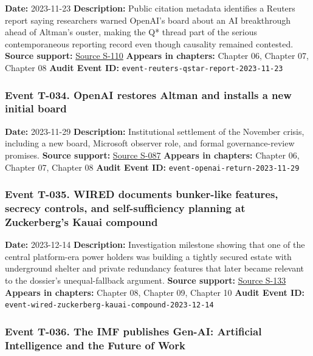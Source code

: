 \documentclass[
  american,
  11pt,
  letterpaper,
]{article}
\begin{document}
\textbf{Date:} 2023-11-23 \textbf{Description:} Public citation metadata
identifies a Reuters report saying researchers warned OpenAI's board
about an AI breakthrough ahead of Altman's ouster, making the Q* thread
part of the serious contemporaneous reporting record even though
causality remained contested. \textbf{Source support:}
\hyperref[source-s-110-openai-researchers-warned-board-of-ai-breakthrough-ahead-of-ceo-ouster-sources-say]{Source
S-110} \textbf{Appears in chapters:} Chapter 06, Chapter 07, Chapter 08
\textbf{Audit Event ID:} \texttt{event-reuters-qstar-report-2023-11-23}

\subsubsection{Event T-034. OpenAI restores Altman and installs a new
initial
board}\label{event-t-034-openai-restores-altman-and-installs-a-new-initial-board}

\textbf{Date:} 2023-11-29 \textbf{Description:} Institutional settlement
of the November crisis, including a new board, Microsoft observer role,
and formal governance-review promises. \textbf{Source support:}
\hyperref[source-s-087-sam-altman-returns-as-ceo-openai-has-a-new-initial-board]{Source
S-087} \textbf{Appears in chapters:} Chapter 06, Chapter 07, Chapter 08
\textbf{Audit Event ID:} \texttt{event-openai-return-2023-11-29}

\subsubsection{Event T-035. WIRED documents bunker-like features,
secrecy controls, and self-sufficiency planning at Zuckerberg's Kauai
compound}\label{event-t-035-wired-documents-bunker-like-features-secrecy-controls-and-self-sufficiency-planning-at-zuckerberg-s-kauai-compound}

\textbf{Date:} 2023-12-14 \textbf{Description:} Investigation milestone
showing that one of the central platform-era power holders was building
a tightly secured estate with underground shelter and private redundancy
features that later became relevant to the dossier's unequal-fallback
argument. \textbf{Source support:}
\hyperref[source-s-133-inside-mark-zuckerbergs-top-secret-hawaii-compound]{Source
S-133} \textbf{Appears in chapters:} Chapter 08, Chapter 09, Chapter 10
\textbf{Audit Event ID:}
\texttt{event-wired-zuckerberg-kauai-compound-2023-12-14}

\subsubsection{Event T-036. The IMF publishes Gen-AI: Artificial
Intelligence and the Future of
Work}\label{event-t-036-the-imf-publishes-gen-ai-artificial-intelligence-and-the-future-of-work}
\end{document}
